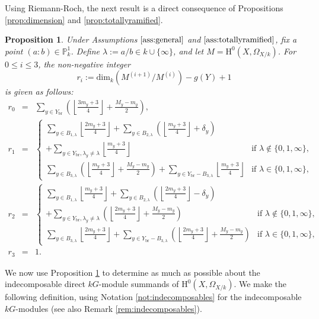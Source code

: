 \documentclass{amsart}
\numberwithin{equation}{section}
\numberwithin{table}{section}
\theoremstyle{plain}
\newtheorem{proposition}[theorem]{Proposition}
\theoremstyle{definition}
\theoremstyle{remark}
\newcommand{\HH}{\mathrm{H}}
\begin{document}
Using Riemann-Roch, the next result is a direct consequence of Propositions \ref{prop:dimension} and \ref{prop:totallyramified}.

\begin{proposition}
\label{prop:dims}
Under Assumptions $\ref{ass:general}$ and $\ref{ass:totallyramified}$, fix a point $(a:b)\in \mathbb{P}^1_k$. Define $\lambda:=a/b\in k\cup\{\infty\}$, and let $M=\HH^0(X,\Omega_{X/k})$.
For $0\le i\le 3$, the non-negative integer
$$r_i:=\mathrm{dim}_k (M^{(i+1)}/M^{(i)})-g(Y)+1$$
is given as follows:
\begin{eqnarray*}
r_0 &=& \sum_{y\in Y_{\mathrm{br}}} \left( \left\lfloor \frac{3m_y+3}{4}\right\rfloor + \frac{M_y-m_y}{2}\right),\\[2ex]
r_1 &=& \left\{ \begin{array}{cl}
\sum_{y\in B_{1,\lambda}}\left\lfloor \frac{2m_y+3}{4}\right\rfloor +
\sum_{y\in B_{2, \lambda}}\left(\left\lfloor \frac{m_y+3}{4}\right\rfloor+\delta_y\right) \\[.5ex]
 +\sum_{y\in Y_{\mathrm{br}}, \lambda_y\ne \lambda} \left\lfloor \frac{m_y+3}{4}\right\rfloor 
&\mbox{if $\lambda\not\in\{0,1,\infty\}$}, 
\\[2ex]
\sum_{y\in B_{3,\lambda}} \left(\left\lfloor \frac{m_y+3}{4}\right\rfloor+\frac{M_y-m_y}{2}\right) +
\sum_{y\in Y_{\mathrm{br}}-B_{3,\lambda}} \left\lfloor \frac{m_y+3}{4}\right\rfloor & \mbox{if $\lambda\in\{0,1,\infty\}$}, 
\end{array}\right.\\[2ex]
r_2 &=& \left\{ \begin{array}{cl}
\sum_{y\in B_{1,\lambda}}\left\lfloor \frac{m_y+3}{4}\right\rfloor +
\sum_{y\in B_{2,\lambda}}\left(\left\lfloor \frac{2m_y+3}{4}\right\rfloor-\delta_y\right) \\[.5ex]
 +\sum_{y\in Y_{\mathrm{br}}, \lambda_y\ne \lambda} \left(\left\lfloor \frac{2m_y+3}{4}\right\rfloor +\frac{M_y-m_y}{2}\right) 
&\mbox{if $\lambda\not\in\{0,1,\infty\}$}, 
\\[2ex]
 \sum_{y\in B_{3,\lambda}} \left\lfloor \frac{2m_y+3}{4}\right\rfloor +
\sum_{y\in Y_{\mathrm{br}}-B_{3,\lambda}} \left(\left\lfloor \frac{2m_y+3}{4}\right\rfloor +\frac{M_y-m_y}{2}\right)
&\mbox{if $\lambda\in\{0,1,\infty\}$}, 
\end{array}\right.\\[2ex]
r_3&=&1.
\end{eqnarray*}
\end{proposition}


We now use Proposition \ref{prop:dims} 
to determine as much as possible about the indecomposable direct $kG$-module summands of $\HH^0(X,\Omega_{X/k})$. We make the following definition, using Notation \ref{not:indecomposables} for the indecomposable $kG$-modules (see also Remark \ref{rem:indecomposables}).
\end{document}
